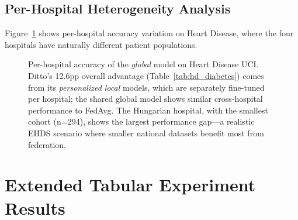 \documentclass[conference,a4paper]{IEEEtran}
\begin{document}
\subsection{Per-Hospital Heterogeneity Analysis}

Figure~\ref{fig:per_hospital} shows per-hospital accuracy variation on Heart Disease, where the four hospitals have naturally different patient populations.

\begin{figure}[htbp]
\centering
{}
\caption{Per-hospital accuracy of the \textit{global} model on Heart Disease UCI. Ditto's 12.6pp overall advantage (Table~\ref{tab:hd_diabetes}) comes from its \textit{personalized local} models, which are separately fine-tuned per hospital; the shared global model shows similar cross-hospital performance to FedAvg. The Hungarian hospital, with the smallest cohort (n=294), shows the largest performance gap---a realistic EHDS scenario where smaller national datasets benefit most from federation.}
\label{fig:per_hospital}
\end{figure}

\section{Extended Tabular Experiment Results}
\label{sec:extended_tabular}
\end{document}

